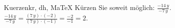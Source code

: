 \begin{MAufgabe}{Kuerzen}{kr, dh, MaTeX}
K\"urzen Sie soweit m\"oglich: $\frac{- 14\, y}{- 7\, y}$.\\ 
\ifLsg\MLoesung
\quad $\frac{- 14\, y}{- 7\, y}=\frac{(7\, y)\cdot(-2)}{(7\, y)\cdot(-1)}=\frac{-2}{-1}=2$.\else\relax\fi
 \end{MAufgabe}